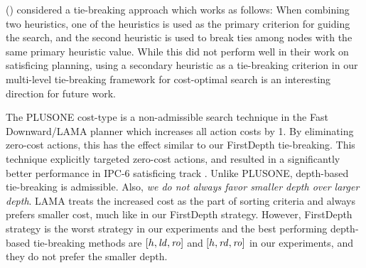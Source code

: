 \citeauthor{RogerH10} (\citeyear{RogerH10}) considered a tie-breaking approach which works as follows:
When combining two heuristics, one of the
heuristics is used as the primary criterion for guiding the search,
and the second heuristic is used to break ties among nodes with the same primary
heuristic value.
While this did not perform well in their work on satisficing planning, 
using a secondary heuristic as a tie-breaking criterion in our multi-level tie-breaking framework 
for cost-optimal search is an interesting direction for future work.

The PLUSONE %
cost-type is a non-admissible search technique in the Fast Downward/LAMA planner
\cite{richter2010lama} which increases all action costs by 1.
By eliminating zero-cost actions, this has the effect similar to our
FirstDepth tie-breaking.
This technique explicitly targeted zero-cost actions,
and resulted in a significantly better performance in IPC-6
satisficing track \cite[p.137, Sec. 3.3.2]{richter2010lama}.
Unlike PLUSONE, depth-based tie-breaking is admissible.
Also, \emph{we
do not always favor smaller depth over larger depth}. LAMA treats the
increased cost as the part of sorting criteria and always prefers
smaller cost, much like in our FirstDepth strategy.  However, FirstDepth
strategy is the worst strategy in our experiments and the best
performing depth-based tie-breaking methods are $[h,\mbox{\textit{ld}},\mbox{\textit{ro}}]$ and $[h,\mbox{\textit{rd}},\mbox{\textit{ro}}]$
in our experiments, and they do not prefer the smaller depth.

